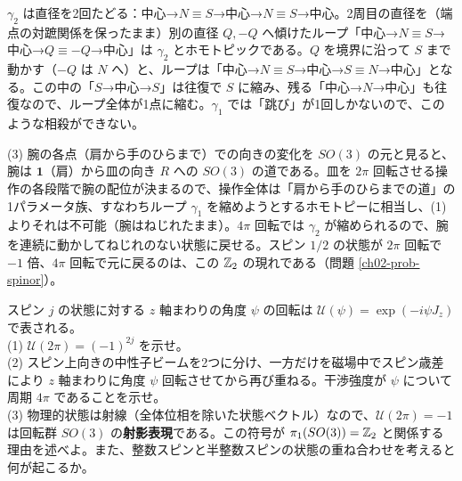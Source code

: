 \begin{solution}
\begin{center}
\end{center}
$\gamma_2$ は直径を2回たどる：中心→$N\equiv S$→中心→$N\equiv S$→中心。2周目の直径を（端点の対蹠関係を保ったまま）別の直径 $Q,-Q$ へ傾けたループ「中心→$N\equiv S$→中心→$Q\equiv-Q$→中心」は $\gamma_2$ とホモトピックである。$Q$ を境界に沿って $S$ まで動かす（$-Q$ は $N$ へ）と、ループは「中心→$N\equiv S$→中心→$S\equiv N$→中心」となる。この中の「$S$→中心→$S$」は往復で $S$ に縮み、残る「中心→$N$→中心」も往復なので、ループ全体が1点に縮む。$\gamma_1$ では「跳び」が1回しかないので、このような相殺ができない。

(3) 腕の各点（肩から手のひらまで）での向きの変化を $SO(3)$ の元と見ると、腕は $\mathbf 1$（肩）から皿の向き $R$ への $SO(3)$ の道である。皿を $2\pi$ 回転させる操作の各段階で腕の配位が決まるので、操作全体は「肩から手のひらまでの道」の1パラメータ族、すなわちループ $\gamma_1$ を縮めようとするホモトピーに相当し、(1) よりそれは不可能（腕はねじれたまま）。$4\pi$ 回転では $\gamma_2$ が縮められるので、腕を連続に動かしてねじれのない状態に戻せる。スピン $1/2$ の状態が $2\pi$ 回転で $-1$ 倍、$4\pi$ 回転で元に戻るのは、この $\mathbb{Z}_2$ の現れである（問題 \ref{ch02-prob-spinor}）。
\end{solution}

\begin{problem}[難易度 A]\label{ch02-prob-spinor}
スピン $j$ の状態に対する $z$ 軸まわりの角度 $\psi$ の回転は $\mathcal U(\psi)=\exp(-i\psi J_z)$ で表される。\\
(1) $\mathcal U(2\pi)=(-1)^{2j}$ を示せ。\\
(2) スピン上向きの中性子ビームを2つに分け、一方だけを磁場中でスピン歳差により $z$ 軸まわりに角度 $\psi$ 回転させてから再び重ねる。干渉強度が $\psi$ について周期 $4\pi$ であることを示せ。\\
(3) 物理的状態は射線（全体位相を除いた状態ベクトル）なので、$\mathcal U(2\pi)=-1$ は回転群 $SO(3)$ の\textbf{射影表現}である。この符号が $\pi_1(SO(3))=\mathbb{Z}_2$ と関係する理由を述べよ。また、整数スピンと半整数スピンの状態の重ね合わせを考えると何が起こるか。
\end{problem}

